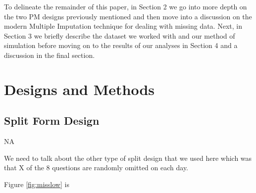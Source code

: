 \documentclass{svjour3}                     %
\begin{document}
To delineate the remainder of this paper, in Section 2 we go into more depth on the two PM designs previously mentioned and then move into a discussion on the modern Multiple Imputation technique for dealing with missing data. Next, in Section 3 we briefly describe the dataset we worked with and our method of simulation before moving on to the results of our analyses in Section 4 and a discussion in the final section. \par

\section{Designs and Methods}
\label{sec:1}
\subsection{Split Form Design}
\label{sec:1.1}

NA

We need to talk about the other type of split design that we used here which was that X of the 8 questions are randomly omitted on each day.  


















Figure \ref{fig:misslow} is 
\end{document}
